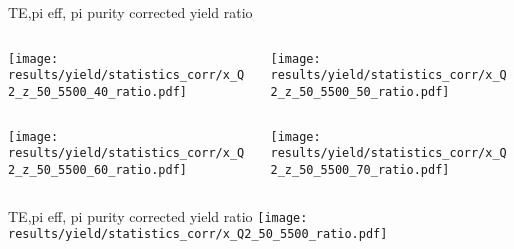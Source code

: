 \begin{frame}{TE,pi eff, pi purity corrected yield ratio}
\begin{columns}
\begin{column}[T]{0.5\textwidth}
\texttt{[image: results/yield/statistics\_corr/x\_Q2\_z\_50\_5500\_40\_ratio.pdf]}
\end{column}
\begin{column}[T]{0.5\textwidth}
\texttt{[image: results/yield/statistics\_corr/x\_Q2\_z\_50\_5500\_50\_ratio.pdf]}
\end{column}
\end{columns}
\begin{columns}
\begin{column}[T]{0.5\textwidth}
\texttt{[image: results/yield/statistics\_corr/x\_Q2\_z\_50\_5500\_60\_ratio.pdf]}
\end{column}
\begin{column}[T]{0.5\textwidth}
\texttt{[image: results/yield/statistics\_corr/x\_Q2\_z\_50\_5500\_70\_ratio.pdf]}
\end{column}
\end{columns}
\end{frame}
\begin{frame}{TE,pi eff, pi purity corrected yield ratio}
\texttt{[image: results/yield/statistics\_corr/x\_Q2\_50\_5500\_ratio.pdf]}
\end{frame}
